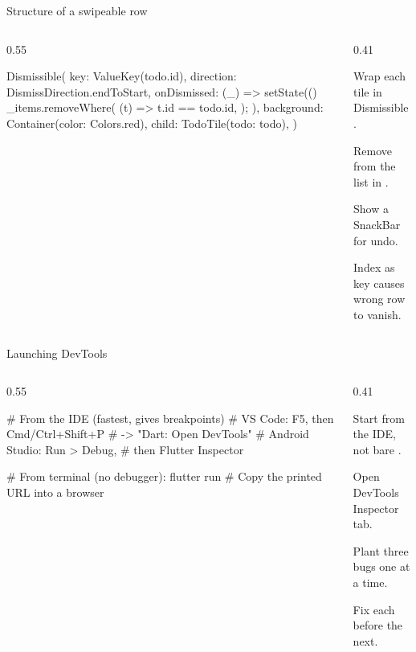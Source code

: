 \documentclass[10pt,aspectratio=169,t]{beamer}
\begin{document}
\begin{frame}[fragile,eyebrow=Task II]{Structure of a swipeable row}
  \begin{columns}[T]
    \begin{column}{0.55\textwidth}
\begin{dart}
Dismissible(
  key: ValueKey(todo.id),
  direction: DismissDirection.endToStart,
  onDismissed: (_) => setState(() {
    _items.removeWhere(
      (t) => t.id == todo.id,
    );
  }),
  background: Container(color: Colors.red),
  child: TodoTile(todo: todo),
)
\end{dart}
    \end{column}
    \begin{column}{0.41\textwidth}
      \begin{steps}
        \item Wrap each tile in Dismissible.
        \item Remove from the list in .
        \item Show a SnackBar for undo.
      \end{steps}
      \begin{warning}
        Index as key causes wrong row to vanish.
      \end{warning}
    \end{column}
  \end{columns}
\end{frame}

\begin{frame}[fragile,eyebrow=Task III]{Launching DevTools}
  \begin{columns}[T]
    \begin{column}{0.55\textwidth}
\begin{shell}
# From the IDE (fastest, gives breakpoints)
# VS Code: F5, then Cmd/Ctrl+Shift+P
#          -> "Dart: Open DevTools"
# Android Studio: Run > Debug,
#         then Flutter Inspector

# From terminal (no debugger):
flutter run
# Copy the printed URL into a browser
\end{shell}
    \end{column}
    \begin{column}{0.41\textwidth}
      \begin{steps}
        \item Start from the IDE, not bare .
        \item Open DevTools Inspector tab.
        \item Plant three bugs one at a time.
        \item Fix each before the next.
      \end{steps}
    \end{column}
  \end{columns}
\end{frame}
\end{document}
